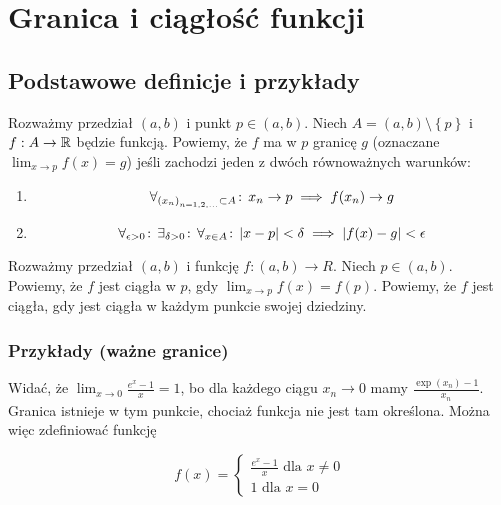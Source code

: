 \documentclass[9pt]{article}
\begin{document}
\section{Granica i ciągłość funkcji}

\subsection{Podstawowe definicje i przykłady}

\begin{Def}
    Rozważmy przedział $(a, b)$ i punkt $p \in (a, b)$. Niech $A = (a, b) \setminus
    \left\{p\right\}$  i $f: A \to \mathbb{R}$ będzie funkcją. Powiemy, że $f$ ma w $p$ granicę $g$
    (oznaczane $\lim_{x \to p} f(x) = g$) jeśli zachodzi jeden z dwóch równoważnych warunków:
    \begin{enumerate}
        \item
            \[
                \forall_{\left(x_n\right)_{n = 1,2,...} \subset A} \! : \, x_n \to p \implies f(x_n) \to g
            \]
        \item 
            \[
                \forall_{\epsilon > 0} \! : \, \exists_{\delta > 0} \! : \, \forall_{x \in A} \! : \, |x-p| < \delta \implies |f(x) - g| <
                \epsilon
            \]
    \end{enumerate}
\end{Def}

\begin{Def}
    Rozważmy przedział $(a, b)$ i funkcję $f: (a, b) \to R$. Niech $p \in (a, b)$. Powiemy, że $f$
    jest ciągła w $p$, gdy $\lim_{x \to p} f(x) = f(p)$. Powiemy, że $f$ jest ciągła, gdy jest
    ciągła w każdym punkcie swojej dziedziny.
\end{Def}

\subsubsection*{Przykłady (ważne granice)}

Widać, że $\lim_{x \to 0} \frac{e^x - 1}{x} = 1$, bo dla każdego ciągu $x_n \to 0$ mamy $
\frac{\exp(x_n)-1}{x_n}$. Granica istnieje w tym punkcie, chociaż funkcja nie jest tam określona.
Można więc zdefiniować funkcję

\[
    f(x) =
    \left\{
        \begin{array}{r}
            \frac{e^x-1}{x} \text{ dla } x \ne 0 \\
            1 \text{ dla } x = 0
        \end{array}
    \right.
\]
\end{document}

